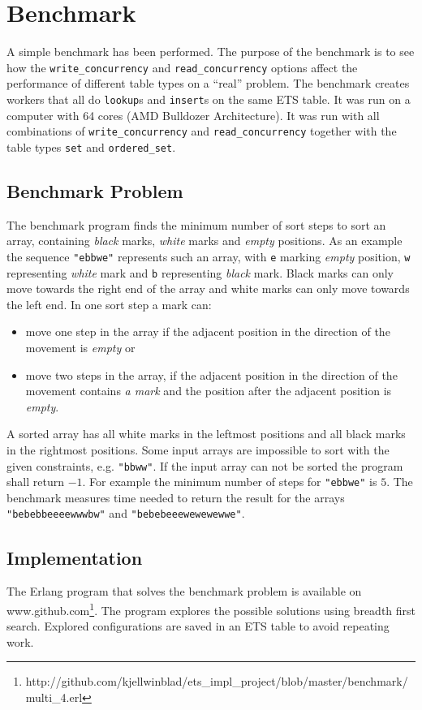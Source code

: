\documentclass[aps,pre,preprint,nofootinbib]{revtex4}
\begin{document}
\section{Benchmark} \label{sec:benchmark}

A simple benchmark has been performed.
The purpose of the benchmark is to see how the \verb|write_concurrency| and \verb|read_concurrency| options affect the performance of different table types on a ``real'' problem.
The benchmark creates workers that all do \verb|lookup|s and \verb|insert|s on the same ETS table.
It was run on a computer with 64 cores (AMD Bulldozer Architecture).
It was run with all combinations of \verb|write_concurrency| and \verb|read_concurrency| together with the table types \verb|set| and \verb|ordered_set|.

\subsection{Benchmark Problem}
The benchmark program finds the minimum number of sort steps to sort an array, containing \emph{black} marks, \emph{white} marks and \emph{empty} positions.
As an example the sequence \verb|"ebbwe"| represents such an array, with \verb|e| marking \emph{empty} position, \verb|w| representing \emph{white} mark and \verb|b| representing \emph{black} mark.
Black marks can only move towards the right end of the array and white marks can only move towards the left end.
In one sort step a mark can:
\begin{itemize}
\item move one step in the array if the adjacent position in the direction of the movement is \emph{empty} or
\item move two steps in the array, if the adjacent position in the direction of the movement contains \emph{a mark} and the position after the adjacent position is \emph{empty}.
\end{itemize}
A sorted array has all white marks in the leftmost positions and all black marks in the rightmost positions.
Some input arrays are impossible to sort with the given constraints, e.g. \verb|"bbww"|.
If the input array can not be sorted the program shall return $-1$.
For example the minimum number of steps for \verb|"ebbwe"| is $5$.
The benchmark measures time needed to return the result for the arrays \verb|"bebebbeeeewwwbw"| and \verb|"bebebeeewewewewwe"|.

\subsection{Implementation}
The Erlang program that solves the benchmark problem is available on www.github.com\footnote{http://github.com/kjellwinblad/ets\_impl\_project/blob/master/benchmark/multi\_4.erl}.
The program explores the possible solutions using breadth first search.
Explored configurations are saved in an ETS table to avoid repeating work.
\end{document}
